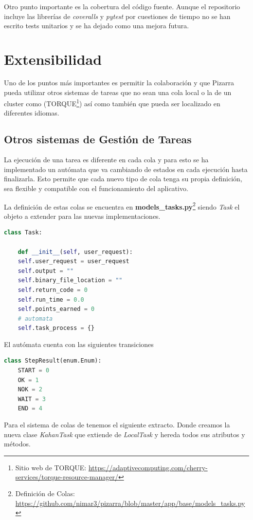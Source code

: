 \documentclass[11pt,spanish,listoffigures,listoftables]{tfgetsinf}
\begin{document}
Otro punto importante es la cobertura del código fuente. Aunque el repositorio incluye las librerías de \textit{coveralls} y \textit{pytest} por cuestiones de tiempo no se han escrito tests unitarios y se ha dejado como una mejora futura.

\chapter{Extensibilidad}

Uno de los puntos más importantes es permitir la colaboración y que Pizarra pueda utilizar otros sistemas de tareas que no sean una \Gls{cola} local o la de un cluster como \kahan(TORQUE\footnote{Sitio web de TORQUE: \url{https://adaptivecomputing.com/cherry-services/torque-resource-manager/}}) así como también que pueda ser localizado en diferentes idiomas.

\section{Otros sistemas de Gestión de Tareas}

La ejecución de una tarea es diferente en cada \Gls{cola} y para esto se ha implementado un autómata que va cambiando de estados en cada ejecución hasta finalizarla. Esto permite que cada nuevo tipo de \Gls{cola} tenga su propia definición, sea flexible y compatible con el funcionamiento del aplicativo.

La definición de estas \Gls{cola}s se encuentra en \textbf{models\_tasks.py}\footnote{Definición de Colas: \url{https://github.com/nimar3/pizarra/blob/master/app/base/models_tasks.py}} siendo \textit{Task} el objeto a extender para las nuevas implementaciones.

\begin{lstlisting}[language=python]
class Task:

	def __init__(self, user_request):
	self.user_request = user_request
	self.output = ""
	self.binary_file_location = ""
	self.return_code = 0
	self.run_time = 0.0
	self.points_earned = 0
	# automata
	self.task_process = {}
\end{lstlisting}

El autómata cuenta con las siguientes transiciones

\begin{lstlisting}[language=python]
class StepResult(enum.Enum):
	START = 0
	OK = 1
	NOK = 2
	WAIT = 3
	END = 4
\end{lstlisting}

Para el sistema de \Gls{cola}s de \kahan tenemos el siguiente extracto. Donde creamos la nueva clase \textit{KahanTask} que extiende de \textit{LocalTask} y hereda todos sus atributos y métodos.
\end{document}

